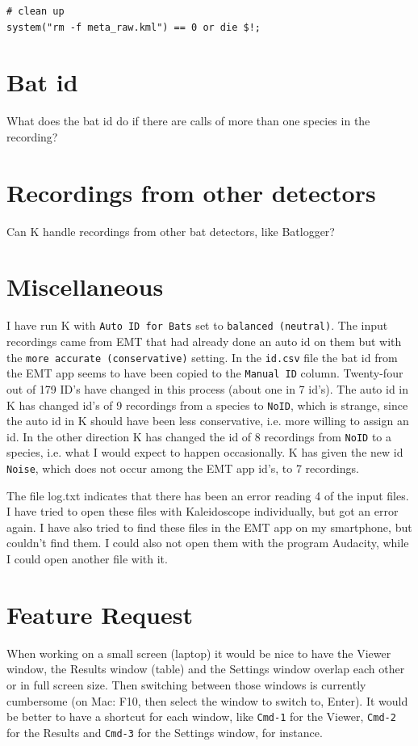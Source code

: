 \documentclass[English, 11pt, twoside, authoryear]{article}
\begin{document}
\begin{lstlisting}
# clean up
system("rm -f meta_raw.kml") == 0 or die $!;
\end{lstlisting}

%
%
%
\section{Bat id}
%
%
%
What does the bat id do if there are calls of more than one species in the recording?


%
%
%
\section{Recordings from other detectors}
%
%
%
Can K handle recordings from other bat detectors, like Batlogger?


%
%
%
\section{Miscellaneous}
%
%
%
I have run K with \texttt{Auto ID for Bats} set to \texttt{balanced (neutral)}. The input recordings came from EMT that had already done an auto id on them but with the \texttt{more accurate (conservative)} setting. In the \texttt{id.csv} file the bat id from the EMT app seems to have been copied to the \texttt{Manual ID} column. Twenty-four out of 179 ID's have changed in this process (about one in 7 id's). The auto id in K has changed id's of 9 recordings from a species to \texttt{NoID}, which is strange, since the auto id in K should have been less conservative, i.e. more willing to assign an id. In the other direction K has changed the id of 8 recordings from \texttt{NoID} to a species, i.e. what I would expect to happen occasionally. K has given the new id \texttt{Noise}, which does not occur among the EMT app id's, to 7 recordings. 

The file log.txt indicates that there has been an error reading 4 of the input files. I have tried to open these files with Kaleidoscope individually, but got an error again. I have also tried to find these files in the EMT app on my smartphone, but couldn't find them. I could also not open them with the
program Audacity, while I could open another file with it.

%
%
%
\section{Feature Request}
%
%
%
When working on a small screen (laptop) it would be nice to have the Viewer window, the Results window (table) and the Settings window overlap each other or in full screen size. Then switching between those windows is currently cumbersome (on Mac: F10, then select the window to switch to, Enter). It would be better to have a shortcut for each window, like \texttt{Cmd-1} for the Viewer, \texttt{Cmd-2} for the Results and \texttt{Cmd-3} for the Settings window, for instance.
\end{document}
